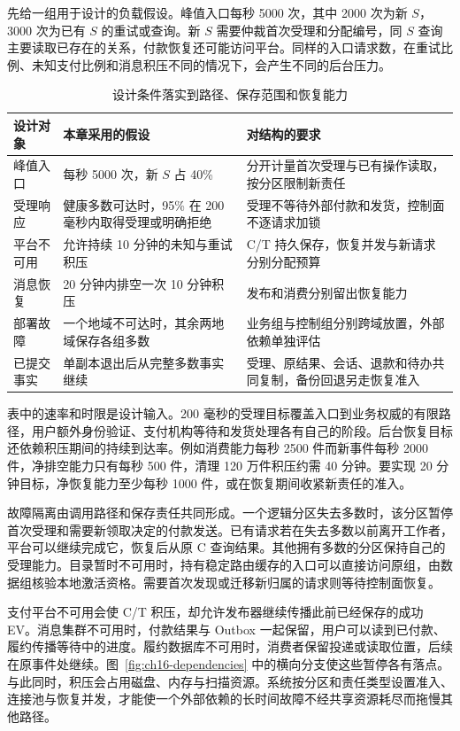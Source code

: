 先给一组用于设计的负载假设。峰值入口每秒 5000 次，其中 2000 次为新 $S$，3000 次为已有 $S$ 的重试或查询。新 $S$ 需要仲裁首次受理和分配编号，同 $S$ 查询主要读取已存在的关系，付款恢复还可能访问平台。同样的入口请求数，在重试比例、未知支付比例和消息积压不同的情况下，会产生不同的后台压力。

\begin{table}[htbp]
\centering\small
\begin{tabularx}{\linewidth}{@{}p{.18\linewidth}p{.35\linewidth}X@{}}
\toprule
设计对象 & 本章采用的假设 & 对结构的要求\\
\midrule
峰值入口 & 每秒 5000 次，新 $S$ 占 40\% & 分开计量首次受理与已有操作读取，按分区限制新责任\\
受理响应 & 健康多数可达时，95\% 在 200 毫秒内取得受理或明确拒绝 & 受理不等待外部付款和发货，控制面不逐请求加锁\\
平台不可用 & 允许持续 10 分钟的未知与重试积压 & C/T 持久保存，恢复并发与新请求分别分配预算\\
消息恢复 & 20 分钟内排空一次 10 分钟积压 & 发布和消费分别留出恢复能力\\
部署故障 & 一个地域不可达时，其余两地域保存各组多数 & 业务组与控制组分别跨域放置，外部依赖单独评估\\
已提交事实 & 单副本退出后从完整多数事实继续 & 受理、原结果、会话、退款和待办共同复制，备份回退另走恢复准入\\
\bottomrule
\end{tabularx}
\caption{设计条件落实到路径、保存范围和恢复能力}\label{tab:ch16-design}
\end{table}

表中的速率和时限是设计输入。200 毫秒的受理目标覆盖入口到业务权威的有限路径，用户额外身份验证、支付机构等待和发货处理各有自己的阶段。后台恢复目标还依赖积压期间的持续到达率。例如消费能力每秒 2500 件而新事件每秒 2000 件，净排空能力只有每秒 500 件，清理 120 万件积压约需 40 分钟。要实现 20 分钟目标，净恢复能力至少每秒 1000 件，或在恢复期间收紧新责任的准入。

故障隔离由调用路径和保存责任共同形成。一个逻辑分区失去多数时，该分区暂停首次受理和需要新领取决定的付款发送。已有请求若在失去多数以前离开工作者，平台可以继续完成它，恢复后从原 C 查询结果。其他拥有多数的分区保持自己的受理能力。目录暂时不可用时，持有稳定路由缓存的入口可以直接访问原组，由数据组核验本地激活资格。需要首次发现或迁移新归属的请求则等待控制面恢复。

支付平台不可用会使 C/T 积压，却允许发布器继续传播此前已经保存的成功 EV。消息集群不可用时，付款结果与 Outbox 一起保留，用户可以读到已付款、履约传播等待中的进度。履约数据库不可用时，消费者保留投递或读取位置，后续在原事件处继续。图~\ref{fig:ch16-dependencies} 中的横向分支使这些暂停各有落点。与此同时，积压会占用磁盘、内存与扫描资源。系统按分区和责任类型设置准入、连接池与恢复并发，才能使一个外部依赖的长时间故障不经共享资源耗尽而拖慢其他路径。


